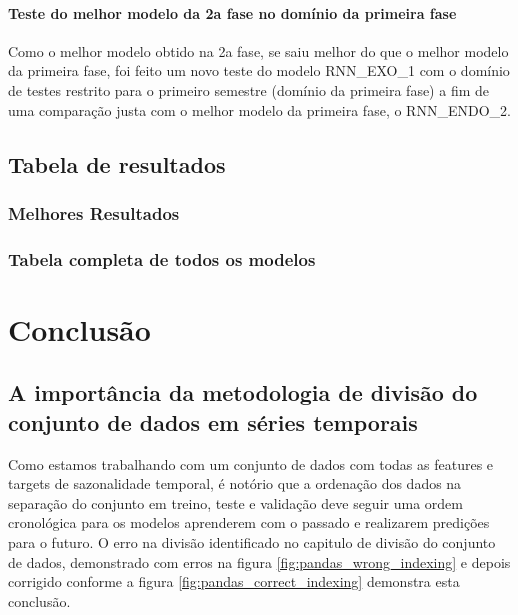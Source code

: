 \documentclass[	12pt, Times, openright, twoside, a4paper, english, brazil]{abntex2}
\begin{document}
    	    \subsubsection{Teste do melhor modelo da 2a fase no domínio da primeira fase}
    	        
    	        
    	        Como o melhor modelo obtido na 2a fase, se saiu melhor do que o melhor modelo da primeira fase, foi feito um novo teste do modelo RNN\_EXO\_1 com o domínio de testes restrito para o primeiro semestre (domínio da primeira fase) a fim de uma comparação justa com o melhor modelo da primeira fase, o RNN\_ENDO\_2.
    	        
    
    \section{Tabela de resultados}
        \subsection{Melhores Resultados}
        \subsection{Tabela completa de todos os modelos}
	    
  \chapter{Conclusão}
    \section{A importância da metodologia de divisão do conjunto de dados em séries temporais}
        Como estamos trabalhando com um conjunto de dados com todas as features e targets de sazonalidade temporal, é notório que a ordenação dos dados na separação do conjunto em treino, teste e validação deve seguir uma ordem cronológica para os modelos aprenderem com o passado e realizarem predições para o futuro. 
        O erro na divisão identificado no capitulo de divisão do conjunto de dados, demonstrado com erros na figura \ref{fig:pandas_wrong_indexing} e depois corrigido conforme a figura \ref{fig:pandas_correct_indexing} demonstra esta conclusão.
\end{document}
